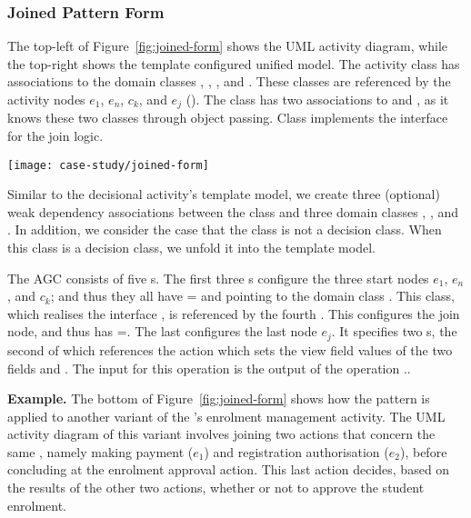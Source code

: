 \subsubsection{Joined Pattern Form} \label{sect:joined-pattern}
The top-left of Figure~\ref{fig:joined-form} shows the UML activity diagram, while the top-right shows the template configured unified model. The activity class  has associations to the domain classes , , , and . These classes are referenced by the activity nodes $ e_1 $, $ e_n $, $ c_k $, and $ e_j $ (\resp). The class  has two associations to  and , as it knows these two classes through object passing. Class  implements the interface  for the join logic.

\begin{figure*}[ht]
\begin{center}
\texttt{[image: case-study/joined-form]}
\end{center}
	\vspace{-0.4cm}
\caption{The joined pattern form.} %
\label{fig:joined-form}
	\vspace{-0.3cm}
\end{figure*}

Similar to the decisional activity's template model, we create three (optional) weak dependency associations between the class  and three domain classes , , and . In addition, we consider the case that the class  is not a decision class. When this class is a decision class, we unfold it into the template model.

The AGC consists of five s. The first three s configure the three start nodes $ e_1 $, $ e_n $, and $ c_k $; and thus they all have = and  pointing to the domain class . This class, which realises the interface , is referenced by the fourth . This  configures the join node, and thus has =. The last  configures the last node $ e_j $. It specifies two s, the second of which references the action   which sets the view field values of the two fields  and . The input for this operation is the output of the operation ..
%

\noindent\textbf{Example.}
The bottom of Figure~\ref{fig:joined-form} shows how the pattern is applied to another variant of the \courseman's enrolment management activity. The UML activity diagram of this variant involves joining two actions that concern the same , namely making payment ($e_1$) and registration authorisation ($e_2$), before concluding at the enrolment approval action. This last action decides, based on the results of the other two actions, whether or not to approve the student enrolment.

